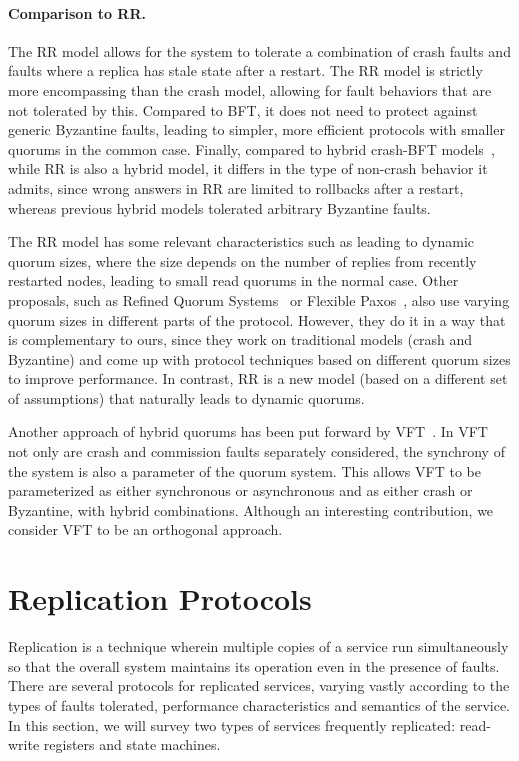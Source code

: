 \paragraph{Comparison to \ac{RR}.}
The \ac{RR} model allows for the system to tolerate a combination of
crash faults and faults where a replica has stale state after a
restart. The \ac{RR} model is strictly more encompassing than
the crash model, allowing for fault behaviors that are
not tolerated by this. Compared to \ac{BFT}, it does not need to
protect against generic Byzantine faults, leading to simpler,
more efficient protocols with smaller quorums in the common case.
Finally, compared to hybrid crash-\ac{BFT}
models~\cite{MeyerPradhan91,bc:hybrid,mc:hybrid,upright}, while
\ac{RR} is also a hybrid model, it differs in the type of
non-crash behavior it admits, since wrong answers in \ac{RR}
are limited to rollbacks after a restart, whereas previous hybrid
models tolerated arbitrary Byzantine faults.

The \ac{RR} model has some relevant characteristics such as
leading to dynamic quorum sizes, where the size depends on the
number of replies from recently restarted nodes, leading to small
read quorums in the normal case. Other proposals, such as Refined
Quorum Systems~\cite{rqs} or Flexible Paxos~\cite{fp},  also use
varying quorum sizes in different parts of the protocol. However,
they do it in a way that is complementary to ours, since they
work on traditional models (crash and Byzantine) and come up with
protocol techniques based on different quorum sizes to improve
performance. In contrast, \ac{RR} is a new model (based on a
different set of assumptions) that naturally leads to dynamic
quorums.

Another approach of hybrid quorums has been put forward by
\ac{VFT}~\cite{visigoth}. In \ac{VFT} not only are crash and
commission faults separately considered, the synchrony of the
system is also a parameter of the quorum system. This allows
\ac{VFT} to be parameterized as either synchronous or asynchronous
and as either crash or Byzantine, with hybrid combinations.
Although an interesting contribution, we consider \ac{VFT} to be
an orthogonal approach.

\section{Replication Protocols}
Replication is a technique wherein multiple copies of a service run
simultaneously so that the overall system maintains its operation
even in the presence of faults. There are several protocols for
replicated services, varying vastly according to the types of
faults tolerated, performance characteristics and semantics of
the service. In this section, we will survey two types of
services frequently replicated: read-write registers and state
machines.

